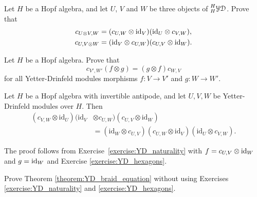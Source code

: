 \begin{exercise}
\label{exercise:YD_hexagons}
Let $H$ be a Hopf algebra, and let $U$, $V$ and $W$
be three objects of $\prescript{H}{H}{\mathcal{YD}}$. Prove that 
\begin{align}
c_{U\otimes V,W} & =(c_{U,W}\otimes\id_{V})(\id_{U}\otimes c_{V,W}),\label{eq:(cx1)(1xc)}\\
c_{U,V\otimes W} & =(\id_{V}\otimes c_{U,W})(c_{U,V}\otimes\id_{W}).\label{eq:(1xc)(cx1)}
\end{align}
\end{exercise}

\begin{exercise}
\label{exercise:YD_naturality}
Let $H$ be a Hopf algebra. Prove that 
\[
c_{V',W'}(f\otimes g)=(g\otimes f)c_{W,V}
\]
for all Yetter-Drinfeld modules morphisms $f:V\to V'$ and $g:W\to W'$. 
\end{exercise}

\begin{theorem}
\label{theorem:YD_braid_equation}
Let $H$ be a Hopf algebra with invertible antipode, and let $U,V,W$
be Yetter-Drinfeld modules over $H$. Then 
\begin{align*}
(c_{V,W}\otimes\textrm{id}_{U})(\textrm{id}_{V}&\otimes c_{U,W})(c_{U,V}\otimes\textrm{id}_{W})\\
&=(\textrm{id}_{W}\otimes c_{U,V})(c_{U,W}\otimes\textrm{id}_{V})(\textrm{id}_{U}\otimes c_{V,W}).
\end{align*}
\end{theorem}

The proof follows from Exercise~\ref{exercise:YD_naturality} with
$f=c_{U,V}\otimes\mathrm{id}_W$ and $g=\mathrm{id}_W$ and Exercise
\ref{exercise:YD_hexagons}.

\begin{exercise}
Prove Theorem \ref{theorem:YD_braid_equation} without using Exercises
\ref{exercise:YD_naturality} and \ref{exercise:YD_hexagons}.
\end{exercise}

